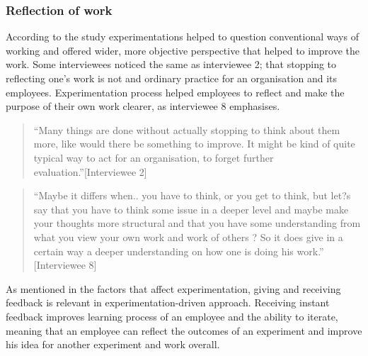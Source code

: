 \subsubsection{Reflection of work}
According to the study experimentations helped to question conventional ways of working and offered wider, more objective perspective that helped to improve the work. Some interviewees noticed the same as interviewee 2; that stopping to reflecting one's work is not and ordinary practice for an organisation and its employees. Experimentation process helped employees to reflect and make the purpose of their own work clearer, as interviewee 8 emphasises. 
\begin{quote}
``Many things are done without actually stopping to think about them more, like would there be something to improve. It might be kind of quite typical way to act for an organisation, to forget further evaluation.''[Interviewee 2]
\end{quote}
\begin{quote}
``Maybe it differs when.. you have to think, or you get to think, but let?s say that you have to think some issue in a deeper level and maybe make your thoughts more structural and that you have some understanding from what you view your own work and work of others ? So it does give in a certain way a deeper understanding on how one is doing his work.'' [Interviewee 8]
\end{quote}
As mentioned in the factors that affect experimentation, giving and receiving feedback is relevant in experimentation-driven approach. Receiving instant feedback improves learning process of an employee and the ability to iterate, meaning that an employee can reflect the outcomes of an experiment and improve his idea for another experiment and work overall. 

